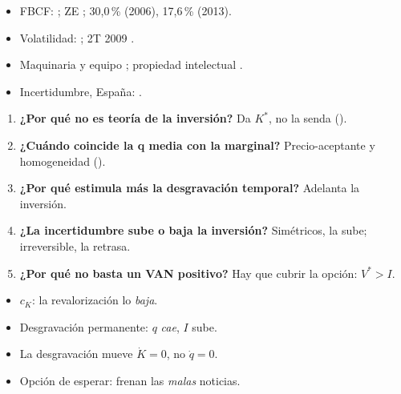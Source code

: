 \documentclass{article}
\begin{document}
\begin{columnas}
\anexorepaso
{}
\begin{itemize}
\item FBCF: ; ZE ; 30,0\,\% (2006), 17,6\,\% (2013).
\item Volatilidad: ; 2T 2009 .
\item Maquinaria y equipo ; propiedad intelectual .
\item Incertidumbre, España: .
\end{itemize}
\begin{enumerate}
\item \textbf{¿Por qué  no es teoría de la inversión?} Da $K^*$, no la senda ().
\item \textbf{¿Cuándo coincide la q media con la marginal?} Precio-aceptante y homogeneidad ().
\item \textbf{¿Por qué estimula más la desgravación temporal?} Adelanta la inversión.
\item \textbf{¿La incertidumbre sube o baja la inversión?} Simétricos, la sube; irreversible, la retrasa.
\item \textbf{¿Por qué no basta un VAN positivo?} Hay que cubrir la opción: $V^*>I$.
\end{enumerate}
\begin{trampa}
\begin{itemize}
\item $c_K$: la revalorización lo \emph{baja}.
\item Desgravación permanente: $q$ \emph{cae}, $I$ sube.
\item La desgravación mueve $\dot K=0$, no $\dot q=0$.
\item Opción de esperar: frenan las \emph{malas} noticias.
\end{itemize}
\end{trampa}

\end{columnas}
\end{document}
